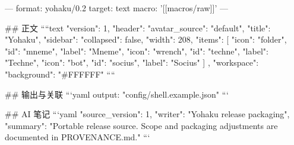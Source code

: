 ---
format: yohaku/0.2
target: text
macro: '[[macros/raw]]'
---

## 正文
````text
{
  "version": 1,
  "header": {"avatar_source": "default", "title": "Yohaku"},
  "sidebar": {
    "collapsed": false,
    "width": 208,
    "items": [
      {"icon": "folder", "id": "mneme", "label": "Mneme"},
      {"icon": "wrench", "id": "techne", "label": "Techne"},
      {"icon": "bot", "id": "socius", "label": "Socius"}
    ]
  },
  "workspace": {"background": "#FFFFFF"}
}
````

## 输出与关联
```yaml
output: "config/shell.example.json"
```

## AI 笔记
```yaml
{"source_version": 1, "writer": "Yohaku release packaging", "summary": "Portable release source. Scope and packaging adjustments are documented in PROVENANCE.md."}
```
